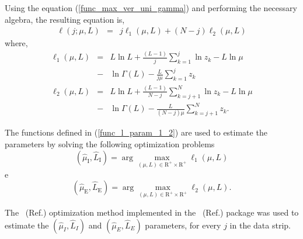 \documentclass[conference]{IEEEtran}
\begin{document}
Using the equation (\ref{func_max_ver_uni_gamma}) and performing the necessary algebra, the resulting equation is, 
\begin{equation}\label{func_l_param}
\begin{array}{ccc}  
  \ell(j;\mu, L)&=&j\ell_1(\mu, L) + (N - j)\ell_2(\mu, L)
 \end{array}
 \end{equation}
where,
 \begin{equation}
\begin{array}{lcl}\label{func_l_param_1_2}
    \ell_1(\mu, L)&=&L\ln L+\frac{(L-1)}{j}\sum_{k=1}^{j}\ln z_k-L\ln\mu\\
    &-&\ln\Gamma(L) -\frac{L}{j\mu}\sum_{k=1}^{j} z_k\\
    \ell_2(\mu, L)&=&L\ln L+\frac{(L-1)}{N-j}\sum_{k=j+1}^{N}\ln z_k-L\ln\mu\\
    &-&\ln\Gamma(L) -\frac{L}{(N-j)\mu}\sum_{k=j+1}^{N} z_k.
 \end{array}
 \end{equation}
 
The functions defined in (\ref{func_l_param_1_2}) are used to estimate the parameters by solving the following optimization problems 
\begin{equation}\label{optimiz_l_1}
(\widehat{\mu}_\text{I},\widehat{L}_\text{I})= \arg\max\limits_{(\mu,L)\in \mathrm{R}^{+}\times\mathrm{R}^{+}}\ell_1(\mu,L)
\end{equation}
e 
\begin{equation}\label{optimiz_l_2}
(\widehat{\mu}_\text{E},\widehat{L}_\text{E})= \arg\max\limits_{(\mu,L)\in \mathrm{R}^{+}\times\mathrm{R}^{+}}\ell_2(\mu,L).
\end{equation} 

The ~(Ref.\cite{nw}) optimization method implemented in the ~(Ref.\cite{ht}) package was used to estimate the $(\widehat{\mu}_I, \widehat{L}_I)$ and $(\widehat{\mu}_E, \widehat{L}_E)$ parameters, for every $j$ in the data strip.
\end{document}
